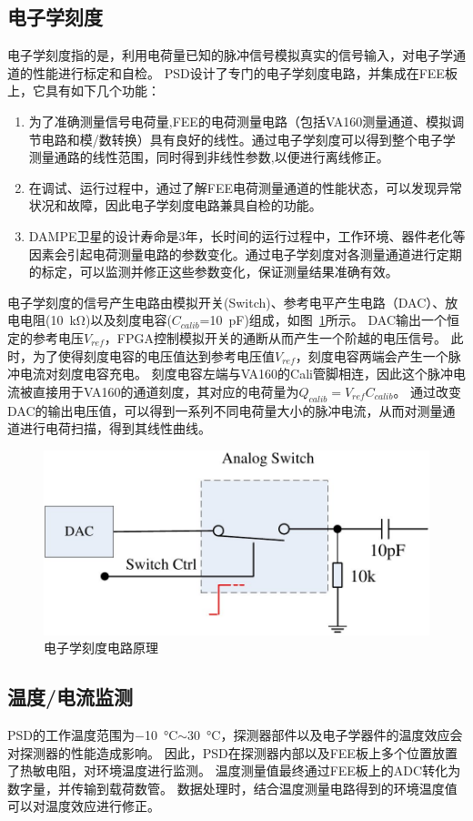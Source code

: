 \subsection{电子学刻度}
电子学刻度指的是，利用电荷量已知的脉冲信号模拟真实的信号输入，对电子学通道的性能进行标定和自检。
PSD设计了专门的电子学刻度电路，并集成在FEE板上，它具有如下几个功能：
\begin{enumerate}
	\item 为了准确测量信号电荷量,FEE的电荷测量电路（包括VA160测量通道、模拟调节电路和模/数转换）具有良好的线性。通过电子学刻度可以得到整个电子学测量通路的线性范围，同时得到非线性参数,以便进行离线修正。
	\item 在调试、运行过程中，通过了解FEE电荷测量通道的性能状态，可以发现异常状况和故障，因此电子学刻度电路兼具自检的功能。
	\item DAMPE卫星的设计寿命是3年，长时间的运行过程中，工作环境、器件老化等因素会引起电荷测量电路的参数变化。通过电子学刻度对各测量通道进行定期的标定，可以监测并修正这些参数变化，保证测量结果准确有效。
\end{enumerate}

电子学刻度的信号产生电路由模拟开关(Switch)、参考电平产生电路（DAC）、放电电阻(\SI{10}{\kilo\ohm})以及刻度电容($C_{calib}$=\SI{10}{\pico\farad})组成，如图~\ref{fig:ch2:fee_calibration}所示。
DAC输出一个恒定的参考电压$V_{ref}$，FPGA控制模拟开关的通断从而产生一个阶越的电压信号。
此时，为了使得刻度电容的电压值达到参考电压值$V_{ref}$，刻度电容两端会产生一个脉冲电流对刻度电容充电。
刻度电容左端与VA160的Cali管脚相连，因此这个脉冲电流被直接用于VA160的通道刻度，其对应的电荷量为$Q_{calib}=V_{ref}C_{calib}$。
通过改变DAC的输出电压值，可以得到一系列不同电荷量大小的脉冲电流，从而对测量通道进行电荷扫描，得到其线性曲线。

\begin{figure}[h!]
\centering
\includegraphics[width=0.7\linewidth]{chap/description/fig/fee_calibration}
\caption{电子学刻度电路原理}
\label{fig:ch2:fee_calibration}
\end{figure}


\subsection{温度/电流监测}
PSD的工作温度范围为\SI{-10}{\celsius}$\sim$\SI{30}{\celsius}，探测器部件以及电子学器件的温度效应会对探测器的性能造成影响。
因此，PSD在探测器内部以及FEE板上多个位置放置了热敏电阻，对环境温度进行监测。
温度测量值最终通过FEE板上的ADC转化为数字量，并传输到载荷数管。
数据处理时，结合温度测量电路得到的环境温度值可以对温度效应进行修正。

